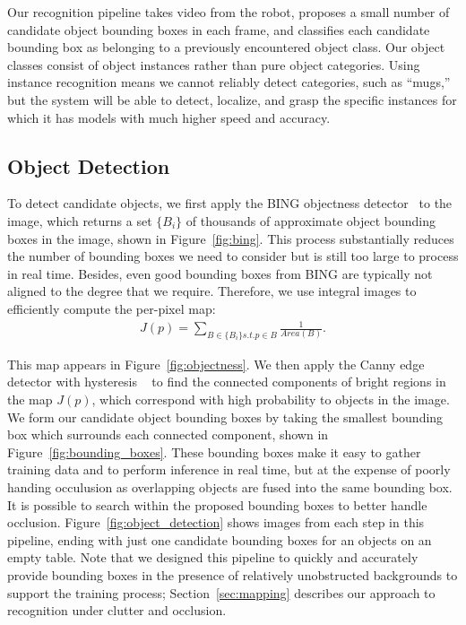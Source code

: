 \documentclass[conference]{IEEEtran}
\begin{document}
Our recognition pipeline takes video from the robot, proposes a small
number of candidate object bounding boxes in each frame, and
classifies each candidate bounding box as belonging to a previously
encountered object class. Our object classes consist of object
instances rather than pure object categories.  Using instance
recognition means we cannot reliably detect categories, such as
``mugs,'' but the system will be able to detect, localize, and grasp
the specific instances for which it has models with much higher speed
and accuracy.

\subsection{Object Detection}
\label{sec:detection}
To detect candidate objects, we first apply the BING objectness
detector~\citep{cheng14} to the image, which returns a set $\{B_i\}$
of thousands of approximate object bounding boxes in the image, shown
in Figure~\ref{fig:bing}. This process substantially reduces the
number of bounding boxes we need to consider but is still too large to
process in real time. Besides, even good bounding boxes from BING are
typically not aligned to the degree that we require. Therefore, we use
integral images to efficiently compute the per-pixel map:
\begin{align}
J(p) = \sum_{B \in \{B_i\} s.t. p \in B} \frac{1}{Area(B)}.
\end{align}

This map appears in Figure~\ref{fig:objectness}.  We then apply the
Canny edge detector with hysteresis ~\citep{canny86} to find the
connected components of bright regions in the map $J(p)$, which
correspond with high probability to objects in the image. We form our
candidate object bounding boxes by taking the smallest bounding box
which surrounds each connected component, shown in
Figure~\ref{fig:bounding_boxes}.  These bounding boxes make it easy to
gather training data and to perform inference in real time, but at the
expense of poorly handing occulusion as overlapping objects are fused
into the same bounding box.  It is possible to search within the
proposed bounding boxes to better handle occlusion.
Figure~\ref{fig:object_detection} shows images from each step in this
pipeline, ending with just one candidate bounding boxes for an objects
on an empty table.  Note that we designed this pipeline to quickly and
accurately provide bounding boxes in the presence of relatively
unobstructed backgrounds to support the training process;
Section~\ref{sec:mapping} describes our approach to recognition under
clutter and occlusion.
\end{document}
